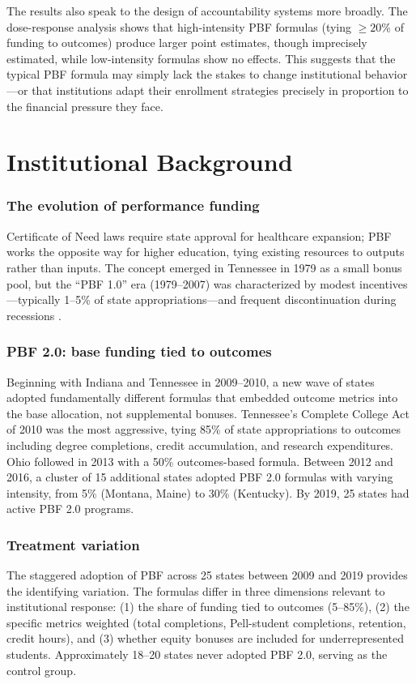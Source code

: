 \documentclass[12pt]{article}
\begin{document}
The results also speak to the design of accountability systems more broadly. The dose-response analysis shows that high-intensity PBF formulas (tying $\geq 20$\% of funding to outcomes) produce larger point estimates, though imprecisely estimated, while low-intensity formulas show no effects. This suggests that the typical PBF formula may simply lack the stakes to change institutional behavior---or that institutions adapt their enrollment strategies precisely in proportion to the financial pressure they face.

\section{Institutional Background}

\subsubsection*{The evolution of performance funding} Certificate of Need laws require state approval for healthcare expansion; PBF works the opposite way for higher education, tying existing resources to outputs rather than inputs. The concept emerged in Tennessee in 1979 as a small bonus pool, but the ``PBF 1.0'' era (1979--2007) was characterized by modest incentives---typically 1--5\% of state appropriations---and frequent discontinuation during recessions \citep{dougherty2015performance}.

\subsubsection*{PBF 2.0: base funding tied to outcomes} Beginning with Indiana and Tennessee in 2009--2010, a new wave of states adopted fundamentally different formulas that embedded outcome metrics into the base allocation, not supplemental bonuses. Tennessee's Complete College Act of 2010 was the most aggressive, tying 85\% of state appropriations to outcomes including degree completions, credit accumulation, and research expenditures. Ohio followed in 2013 with a 50\% outcomes-based formula. Between 2012 and 2016, a cluster of 15 additional states adopted PBF 2.0 formulas with varying intensity, from 5\% (Montana, Maine) to 30\% (Kentucky). By 2019, 25 states had active PBF 2.0 programs.

\subsubsection*{Treatment variation} The staggered adoption of PBF across 25 states between 2009 and 2019 provides the identifying variation. The formulas differ in three dimensions relevant to institutional response: (1) the share of funding tied to outcomes (5--85\%), (2) the specific metrics weighted (total completions, Pell-student completions, retention, credit hours), and (3) whether equity bonuses are included for underrepresented students. Approximately 18--20 states never adopted PBF 2.0, serving as the control group.
\end{document}
